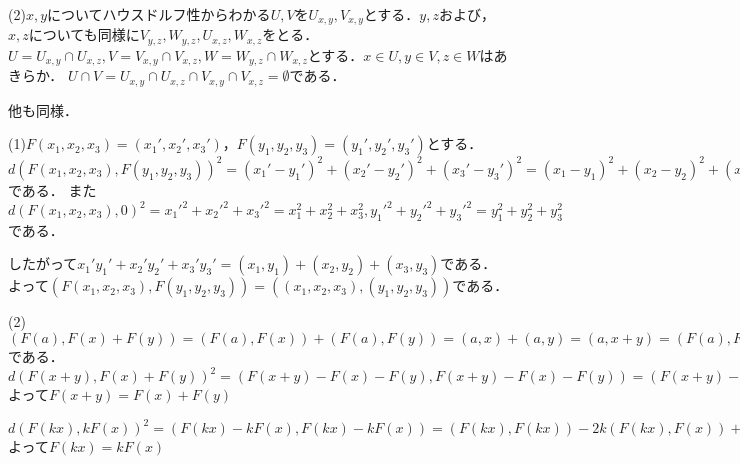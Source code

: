 \documentclass[
		book,
		head_space=20mm,
		foot_space=20mm,
		gutter=10mm,
		line_length=190mm
]{jlreq}
\begin{document}
(2)$x,y$についてハウスドルフ性からわかる$U,V$を$U_{x,y},V_{x,y}$とする．$y,z$および，$x,z$についても同様に$V_{y,z},W_{y,z},U_{x,z},W_{x,z}$をとる．
$U=U_{x,y}\cap U_{x,z},V=V_{x,y}\cap V_{x,z},W=W_{y,z}\cap W_{x,z}$とする．$x\in U,y\in V,z \in W$はあきらか．
$U\cap V=U_{x,y}\cap U_{x,z} \cap V_{x,y}\cap V_{x,z}=\emptyset$である．

他も同様．


 (1)$F(x_1,x_2,x_3)=(x_1',x_2',x_3')，F(y_1,y_2,y_3)=(y_1',y_2',y_3')$とする．$d(F(x_1,x_2,x_3),F(y_1,y_2,y_3))^2=(x_1'-y_1')^2+(x_2'-y_2')^2+(x_3'-y_3')^2=(x_1-y_1)^2+(x_2-y_2)^2+(x_3-y_3)^2$である．
 また$d(F(x_1,x_2,x_3),0)^2=x_1'^2+x_2'^2+x_3'^2=x_1^2+x_2^2+x_3^2,y_1'^2+y_2'^2+y_3'^2=y_1^2+y_2^2+y_3^2$である．

 したがって$x_1'y_1'+x_2'y_2'+x_3'y_3'=(x_1,y_1)+(x_2,y_2)+(x_3,y_3)$である．
 よって$(F(x_1,x_2,x_3),F(y_1,y_2,y_3))=((x_1,x_2,x_3),(y_1,y_2,y_3))$である．

 (2)$(F(a),F(x)+F(y))=(F(a),F(x))+(F(a),F(y))=(a,x)+(a,y)=(a,x+y)=(F(a),F(x+y))$である．
 $d(F(x+y),F(x)+F(y))^2=(F(x+y)-F(x)-F(y),F(x+y)-F(x)-F(y))=
 (F(x+y)-F(x)-F(y),F(x+y-x-y))=0$よって$F(x+y)=F(x)+F(y)$

$d(F(kx),kF(x))^2=(F(kx)-kF(x),F(kx)-kF(x))=(F(kx),F(kx))-2k(F(kx),F(x))+k^2(F(x),F(x))=(kx,kx)-2k(kx,x)+k^2(x,x)=0$よって$F(kx)=kF(x)$
\end{document}

